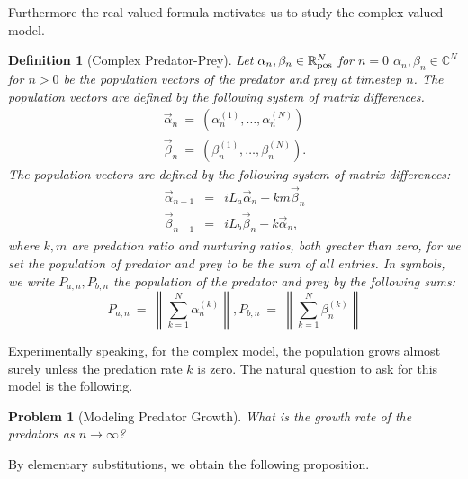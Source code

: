 \documentclass[11pt,reqno]{amsart}
\numberwithin{equation}{section}
\theoremstyle{plain}
\newtheorem{definition}[thm]{Definition}
\newtheorem{problem}[thm]{Problem}
\begin{document}
Furthermore the real-valued formula motivates us to study the complex-valued model. 

\begin{definition}[Complex Predator-Prey]\label{thm:complexModel}
Let 
 $\alpha_n, \beta_n \in \mathbb R_{\rm pos}^N$ for $n = 0$
$\alpha_n, \beta_n \in \mathbb C^N$ for $n > 0$ be the population vectors 
of the predator and prey at timestep $n$. The population 
vectors are defined by the following 
system of matrix differences. 
\begin{eqnarray}
    \vec \alpha_n \ = \ (\alpha_n^{(1)}, \dots, \alpha_n^{(N)}) 
    \nonumber \\
    \vec \beta_n \ = \ (\beta_n^{(1)}, \dots, \beta_n^{(N)}).
\end{eqnarray}
 The population 
vectors are defined by the following 
system of matrix differences: 
\begin{eqnarray}
    \vec \alpha_{n + 1} &=& iL_a \vec \alpha_n + k m \vec \beta_n \nonumber \\ 
    \vec \beta_{n + 1} &=& iL_b \vec \beta_n - k \vec \alpha_n,
\end{eqnarray}
where $k, m$ are predation ratio and nurturing ratios, both greater than zero, for we set the population of predator and prey to be the sum 
of all entries. In symbols, we write $P_{a, n}, P_{b, n}$ the population 
of the predator and prey by the following sums:
\begin{equation}
    P_{a, n} \ = \ \left\|\sum_{k = 1}^{N} \alpha^{(k)}_{n} \right\|
    ,
    P_{b, n} \ = \ \left\|\sum_{k = 1}^{N} \beta^{(k)}_{n} \right\|
\end{equation}
\end{definition}

Experimentally speaking, for the complex model, the population 
grows almost surely unless the predation rate $k$ is zero. The natural 
question to ask for this model is the following. 

\begin{problem}[Modeling Predator Growth]
    What is the growth rate of the predators as $n \rightarrow \infty$?
\end{problem}


By elementary substitutions, we obtain the following proposition. 
\end{document}
